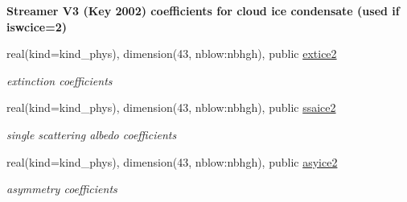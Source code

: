 \begin{Indent}\textbf{ Streamer V3 (Key 2002) coefficients for cloud ice condensate (used if iswcice=2)}\par
\begin{DoxyCompactItemize}
\item 
\mbox{\label{namespacemodule__radsw__cldprtb_a8ed403302034ea073243157749673e14}} 
real(kind=kind\+\_\+phys), dimension(43, nblow\+:nbhgh), public \hyperlink{namespacemodule__radsw__cldprtb_a8ed403302034ea073243157749673e14}{extice2}
\begin{DoxyCompactList}\small\item\em extinction coefficients \end{DoxyCompactList}\item 
\mbox{\label{namespacemodule__radsw__cldprtb_a48555ff54d3a46f8c49733ff82e94d70}} 
real(kind=kind\+\_\+phys), dimension(43, nblow\+:nbhgh), public \hyperlink{namespacemodule__radsw__cldprtb_a48555ff54d3a46f8c49733ff82e94d70}{ssaice2}
\begin{DoxyCompactList}\small\item\em single scattering albedo coefficients \end{DoxyCompactList}\item 
\mbox{\label{namespacemodule__radsw__cldprtb_ad9328ffc5e90cc62c8c9c5089b55fc79}} 
real(kind=kind\+\_\+phys), dimension(43, nblow\+:nbhgh), public \hyperlink{namespacemodule__radsw__cldprtb_ad9328ffc5e90cc62c8c9c5089b55fc79}{asyice2}
\begin{DoxyCompactList}\small\item\em asymmetry coefficients \end{DoxyCompactList}\end{DoxyCompactItemize}
\end{Indent}
